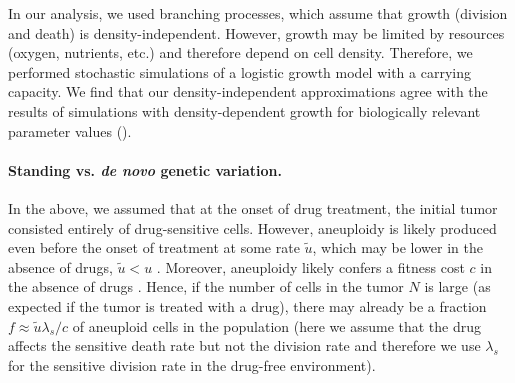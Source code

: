 \documentclass[12pt]{extarticle}
\begin{document}
In our analysis, we used branching processes, which assume that growth (division and death) is density-independent. However, growth may be limited by resources (oxygen, nutrients, etc.) and therefore depend on cell density. 
Therefore, we performed stochastic simulations of a logistic growth model with a carrying capacity. 
We find that our density-independent approximations agree with the results of simulations with density-dependent growth for biologically relevant parameter values ().

\paragraph*{Standing vs. \textit{de novo} genetic variation.}

In the above, we assumed that at the onset of drug treatment, the initial tumor consisted entirely of drug-sensitive cells.
However, aneuploidy is likely produced even before the onset of treatment at some rate $\tilde{u}$, which may be lower in the absence of drugs, $\tilde{u} < u$ \citep{wang2019molecular,mason2017functional}. Moreover, aneuploidy likely confers a fitness cost $c$ in the absence of drugs \citep{replogle2020aneuploidy,giam2015aneuploidy}.
Hence, if the number of cells in the tumor $N$ is large (as expected if the tumor is treated with a drug), there may already be a fraction $f \approx \tilde{u}\lambda_s/c$ of aneuploid cells in the population (here we assume that the drug affects the sensitive death rate but not the division rate and therefore we use $\lambda_s$ for the sensitive division rate in the drug-free environment).
\end{document}
